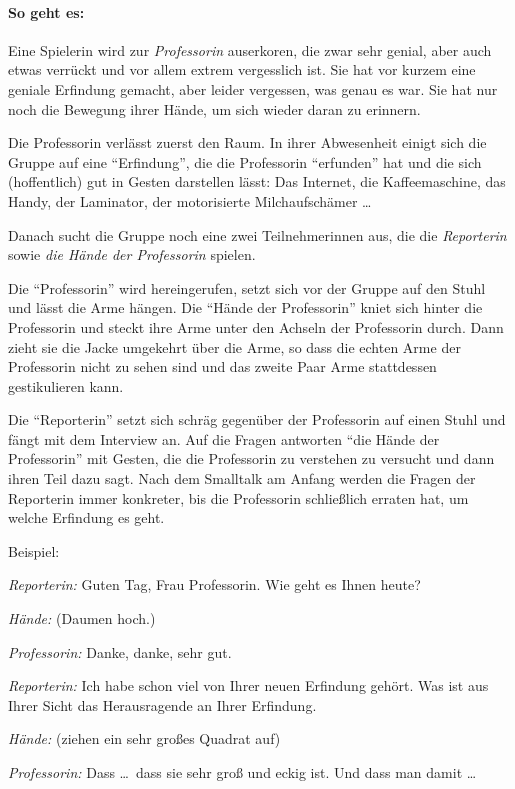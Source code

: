 \paragraph{So geht es:} Eine Spielerin wird zur \emph{Professorin} auserkoren, die zwar sehr genial, aber auch etwas verrückt und vor allem extrem vergesslich ist. Sie hat vor kurzem eine geniale Erfindung gemacht, aber leider vergessen, was genau es war. Sie hat nur noch die Bewegung ihrer Hände, um sich wieder daran zu erinnern. 

Die Professorin verlässt zuerst den Raum. In ihrer Abwesenheit einigt sich die Gruppe auf eine "`Erfindung"', die die Professorin "`erfunden"' hat und die sich (hoffentlich) gut in Gesten darstellen lässt: Das Internet, die Kaffeemaschine, das Handy, der Laminator, der motorisierte Milchaufschämer \ldots

Danach sucht die Gruppe noch eine zwei Teilnehmerinnen aus, die die \emph{Reporterin} sowie \emph{die Hände der Professorin} spielen.

Die "`Professorin"' wird hereingerufen, setzt sich vor der Gruppe auf den Stuhl und lässt die Arme hängen. Die "`Hände der Professorin"' kniet sich hinter die Professorin und steckt ihre Arme unter den Achseln der Professorin durch. Dann zieht sie die Jacke umgekehrt über die Arme, so dass die echten Arme der Professorin nicht zu sehen sind und das zweite Paar Arme stattdessen gestikulieren kann.

Die "`Reporterin"' setzt sich schräg gegenüber der Professorin auf einen Stuhl und fängt mit dem Interview an. Auf die Fragen antworten "`die Hände der Professorin"' mit Gesten, die die Professorin zu verstehen zu versucht und dann ihren Teil dazu sagt. Nach dem Smalltalk am Anfang werden die Fragen der Reporterin immer konkreter, bis die Professorin schließlich erraten hat, um welche Erfindung es geht. 

Beispiel:

\emph{Reporterin:} Guten Tag, Frau Professorin. Wie geht es Ihnen heute?

\emph{Hände:} (Daumen hoch.)

\emph{Professorin:} Danke, danke, sehr gut.

\emph{Reporterin:} Ich habe schon viel von Ihrer neuen Erfindung gehört. Was ist aus Ihrer Sicht das Herausragende an Ihrer Erfindung.

\emph{Hände:} (ziehen ein sehr großes Quadrat auf)

\emph{Professorin:} Dass \ldots\ dass sie sehr groß und eckig ist. Und dass man damit \ldots


